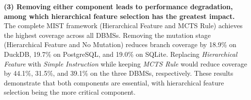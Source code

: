 \textbf{(3) Removing either component leads to performance degradation, among which hierarchical feature selection has the greatest impact.} The complete MIST framework (Hierarchical Feature and MCTS Rule) achieves the highest coverage across all DBMSs. Removing the mutation stage (Hierarchical Feature and No Mutation) reduces branch coverage by 18.9\% on DuckDB, 19.7\% on PostgreSQL, and 19.0\% on SQLite. Replacing \textit{Hierarchical Feature} with \textit{Simple Instruction} while keeping \textit{MCTS Rule} would reduce coverage by 44.1\%, 31.5\%, and 39.1\% on the three DBMSs, respectively. These results demonstrate that both components are essential, with hierarchical feature selection being the more critical component.


\noindent
{}
